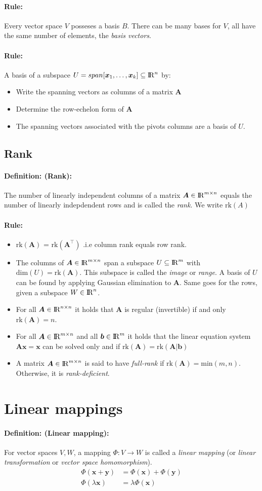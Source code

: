 \documentclass[12pt]{article}
\newcommand{\R}{{\rm I\!R}}
\newcommand{\A}{{\bm{A}}}
\newcommand{\vecs}[2]{{\bm{#1}_1, \dots, \bm{#1}_#2}}
\newcommand{\xdefinition}[2]{\paragraph{\colorbox{#1!30}{\textbf{Definition:}} (#2):}}
\newcommand{\xrule}[1]{\paragraph{\colorbox{#1!30}{\textbf{Rule:}}}}
\begin{document}
\xrule{red} Every vector space $V$ posseses a basis $B$. There can be many bases for $V$, all have the same number of elements, the \textit{basis vectors}.

\xrule{red} A basis of a subspace $U = span[\vecs{x}{k}] \subseteq \R^n$ by:
%
\begin{itemize}
	\item Write the spanning vectors as columns of a matrix $\A$
	\item Determine the row-echelon form of $\A$
	\item The spanning vectors associated with the pivots columns are a basis of $U$. 
\end{itemize}

\subsection{Rank}

\xdefinition{red}{Rank} The number of linearly independent columns of a matrix $\A \in \R^{m \times n}$ equals the number of linearly indepdendent rows and is called the \textit{rank}. We write $\text{rk}(A)$

\xrule{red}
%
\begin{itemize}
	\item $\text{rk}(\A)$ = $\text{rk}(\A^\top)$ .i.e column rank equals row rank.
	\item The columns of $\A \in \R^{m \times n}$ span a subspace $U \subseteq \R^m$ with $\text{dim}(U) = \text{rk}(\A)$. This subspace is called the \textit{image} or \textit{range}. A basis of $U$ can be found by applying Gaussian elimination to $\A$. Same goes for the rows, given a subspace $W \in \R^n$.	
	\item For all $\A \in \R^{n \times n}$ it holds that $\A$ is regular (invertible) if and only $\text{rk}(\A) = n$.
	\item For all $\A \in \R^{m \times n}$ and all $\bm{b} \in \R^m$ it holds that the linear equation system $\A \bm{x} = \bm{x}$ can be solved only and if $\text{rk}(\A) = \text{rk}(\A | \bm{b})$
	\item A matrix $\A \in \R^{m \times n}$ is said to have \textit{full-rank} if $\text{rk}(\A) = \text{min}(m, n)$. Otherwise, it is \textit{rank-deficient}.
\end{itemize}

\section{Linear mappings}

\xdefinition{red}{Linear mapping} For vector spaces $V, W$, a mapping $\Phi : V \rightarrow W$ is called a \textit{linear mapping} (or \textit{linear transformation} or \textit{vector space homomorphism}).
%
\begin{equation}
\begin{aligned}
	\Phi(\bm{x} + \bm{y}) &= \Phi(\bm{x}) + \Phi(\bm{y}) \\
	\Phi(\lambda \bm{x}) &= \lambda \Phi(\bm{x})
\end{aligned}
\end{equation}
\end{document}
